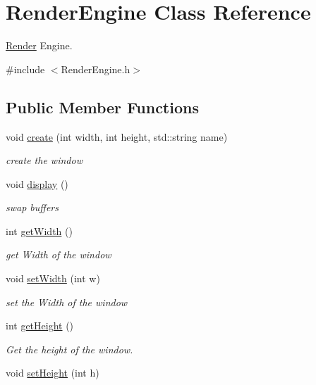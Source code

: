 \hypertarget{class_render_engine}{\section{Render\-Engine Class Reference}
\label{class_render_engine}
}


\hyperlink{class_render}{Render} Engine.  




{\ttfamily \#include $<$Render\-Engine.\-h$>$}

\subsection*{Public Member Functions}
\begin{DoxyCompactItemize}
\item 
void \hyperlink{class_render_engine_a7bb821d7e18008bd0e5d954d7b56ec6d}{create} (int width, int height, std\-::string name)
\begin{DoxyCompactList}\small\item\em create the window \end{DoxyCompactList}\item 
void \hyperlink{class_render_engine_a547e76ef1a421a3e213a2855d8470e2e}{display} ()
\begin{DoxyCompactList}\small\item\em swap buffers \end{DoxyCompactList}\item 
int \hyperlink{class_render_engine_ab7279de663ddad610fae03c3aecdb155}{get\-Width} ()
\begin{DoxyCompactList}\small\item\em get Width of the window \end{DoxyCompactList}\item 
void \hyperlink{class_render_engine_a44f785dafba934d8ab822a1aaf024d9d}{set\-Width} (int w)
\begin{DoxyCompactList}\small\item\em set the Width of the window \end{DoxyCompactList}\item 
int \hyperlink{class_render_engine_a04049d5f051357dcf4ac66c2199da2c5}{get\-Height} ()
\begin{DoxyCompactList}\small\item\em Get the height of the window. \end{DoxyCompactList}\item 
void \hyperlink{class_render_engine_ace5627cb71113ce09e681ba2c052af32}{set\-Height} (int h)

\end{DoxyCompactItemize}
